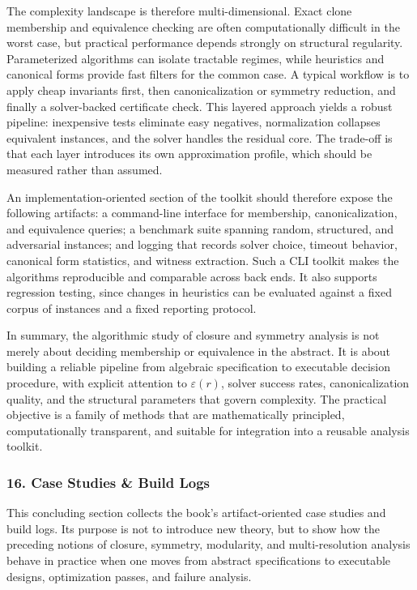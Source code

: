\documentclass[11pt]{article}
\begin{document}
The complexity landscape is therefore multi-dimensional. Exact clone membership and equivalence checking are often computationally difficult in the worst case, but practical performance depends strongly on structural regularity. Parameterized algorithms can isolate tractable regimes, while heuristics and canonical forms provide fast filters for the common case. A typical workflow is to apply cheap invariants first, then canonicalization or symmetry reduction, and finally a solver-backed certificate check. This layered approach yields a robust pipeline: inexpensive tests eliminate easy negatives, normalization collapses equivalent instances, and the solver handles the residual core. The trade-off is that each layer introduces its own approximation profile, which should be measured rather than assumed.

An implementation-oriented section of the toolkit should therefore expose the following artifacts: a command-line interface for membership, canonicalization, and equivalence queries; a benchmark suite spanning random, structured, and adversarial instances; and logging that records solver choice, timeout behavior, canonical form statistics, and witness extraction. Such a CLI toolkit makes the algorithms reproducible and comparable across back ends. It also supports regression testing, since changes in heuristics can be evaluated against a fixed corpus of instances and a fixed reporting protocol.

In summary, the algorithmic study of closure and symmetry analysis is not merely about deciding membership or equivalence in the abstract. It is about building a reliable pipeline from algebraic specification to executable decision procedure, with explicit attention to \(\varepsilon(r)\), solver success rates, canonicalization quality, and the structural parameters that govern complexity. The practical objective is a family of methods that are mathematically principled, computationally transparent, and suitable for integration into a reusable analysis toolkit.



\subsubsection{16. Case Studies \& Build Logs}


This concluding section collects the book's artifact-oriented case studies and build logs. Its purpose is not to introduce new theory, but to show how the preceding notions of closure, symmetry, modularity, and multi-resolution analysis behave in practice when one moves from abstract specifications to executable designs, optimization passes, and failure analysis.
\end{document}
